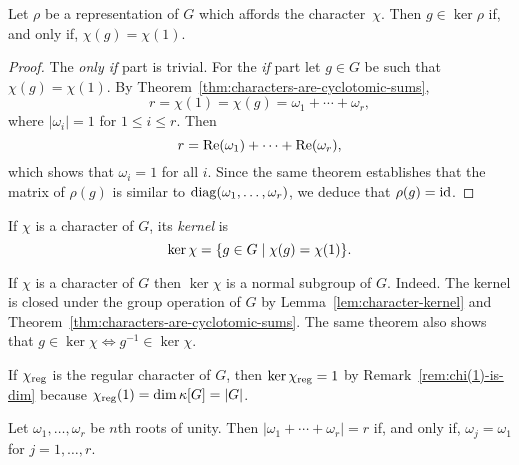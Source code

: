 \begin{lem}\label{lem:character-kernel}
    Let $\rho$ be a representation of\/ $G$ which affords the character\/~$\chi$. Then\/ $g\in\ker\rho$ if, and only if, $\chi(g)=\chi(1)$.
\end{lem}

\begin{proof}
    The \textit{only if\/} part is trivial. For the \textit{if\/} part let $g\in G$ be such that $\chi(g)=\chi(1)$. By Theorem~\ref{thm:characters-are-cyclotomic-sums},
    $$
        r=\chi(1)=\chi(g)=\omega_1+\cdots+\omega_r,
    $$
    where $|\omega_i|=1$ for $1\le i\le r$. Then
    $$
        r = \operatorname{Re}(\omega_1)+\cdots+\operatorname{Re}(\omega_r),
    $$
    which shows that $\omega_i=1$ for all $i$. Since the same theorem establishes that the matrix of $\rho(g)$ is similar to ${\operatorname{diag}}(\omega_1,\dots,\omega_r)$, we deduce that $\rho(g)=\operatorname{id}$.
\end{proof}

\begin{defn}
    If $\chi$ is a character of $G$, its \textsl{kernel} is 
    $$
        \ker\chi= \{g\in G\mid\chi(g)=\chi(1)\}.
    $$
\end{defn}

\begin{rem}\label{rem:character-kernels-are-normal}
    If $\chi$ is a character of $G$ then $\ker\chi$ is a normal subgroup of $G$. Indeed. The kernel is closed under the group operation of $G$ by Lemma~\ref{lem:character-kernel} and Theorem~\ref{thm:characters-are-cyclotomic-sums}. The same theorem also shows that $g\in\ker\chi\iff g^{-1}\in\ker\chi$.
\end{rem}

\begin{rem}\label{rem:regular-kernel-is-trivial}
    If $\chi_{\mathrm{reg}}$ is the regular character of $G$, then $\ker\chi_{\mathrm{reg}}=1$ by Remark~\ref{rem:chi(1)-is-dim} because $\chi_{\mathrm{reg}}(1)=\dim\kappa[G]=|G|$.
\end{rem}

\begin{lem}\label{lem:identical-roots-of-unity}
    Let $\omega_1,\dots,\omega_r$ be $n$th roots of unity. Then $|\omega_1+\cdots+\omega_r|=r$ if, and only if, $\omega_j=\omega_1$ for $j=1,\dots,r$.
\end{lem}

